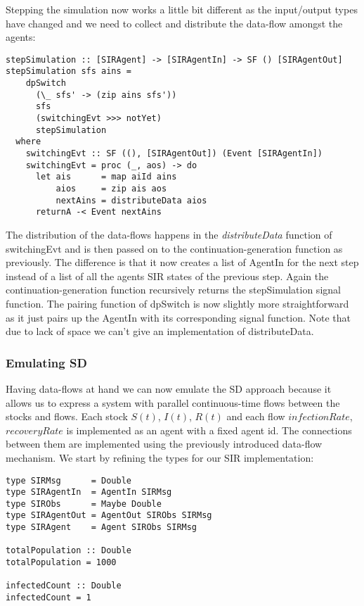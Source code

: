 Stepping the simulation now works a little bit different as the input/output types have changed and we need to collect and distribute the data-flow amongst the agents:

\begin{verbatim}
stepSimulation :: [SIRAgent] -> [SIRAgentIn] -> SF () [SIRAgentOut]
stepSimulation sfs ains =
    dpSwitch
      (\_ sfs' -> (zip ains sfs'))
      sfs
      (switchingEvt >>> notYet)
      stepSimulation
  where
    switchingEvt :: SF ((), [SIRAgentOut]) (Event [SIRAgentIn])
    switchingEvt = proc (_, aos) -> do
      let ais      = map aiId ains
          aios     = zip ais aos
          nextAins = distributeData aios
      returnA -< Event nextAins
\end{verbatim}

The distribution of the data-flows happens in the \textit{distributeData} function of switchingEvt and is then passed on to the continuation-generation function as previously. The difference is that it now creates a list of AgentIn for the next step instead of a list of all the agents SIR states of the previous step. Again the continuation-generation function recursively returns the stepSimulation signal function. The pairing function of dpSwitch is now slightly more straightforward as it just pairs up the AgentIn with its corresponding signal function. Note that due to lack of space we can't give an implementation of distributeData.

\subsubsection{Emulating SD}
Having data-flows at hand we can now emulate the SD approach because it allows us to express a system with parallel continuous-time flows between the stocks and flows. Each stock $S(t)$, $I(t)$, $R(t)$ and each flow $infectionRate$, $recoveryRate$ is implemented as an agent with a fixed agent id. The connections between them are implemented using the previously introduced data-flow mechanism. We start by refining the types for our SIR implementation:

\begin{verbatim}
type SIRMsg      = Double
type SIRAgentIn  = AgentIn SIRMsg
type SIRObs      = Maybe Double
type SIRAgentOut = AgentOut SIRObs SIRMsg
type SIRAgent    = Agent SIRObs SIRMsg

totalPopulation :: Double
totalPopulation = 1000

infectedCount :: Double
infectedCount = 1
\end{verbatim}

